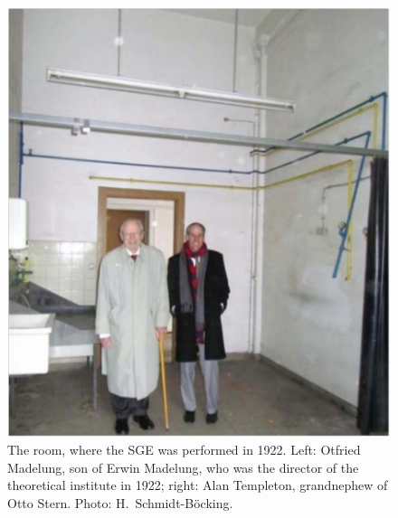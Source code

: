 \documentclass{article}
\begin{document}
%
\begin{figure}
\begin{center}
\includegraphics[scale=0.45]{figures/SGE_room}
\caption{The room, where the SGE was performed in 1922. Left: Otfried Madelung, son of Erwin Madelung, who was the director of the theoretical institute in 1922; right: Alan Templeton, grandnephew of Otto Stern. Photo: H.~Schmidt-B\"ocking.}
\label{fig:SGEroom}
\end{center}
\end{figure}
\end{document}

